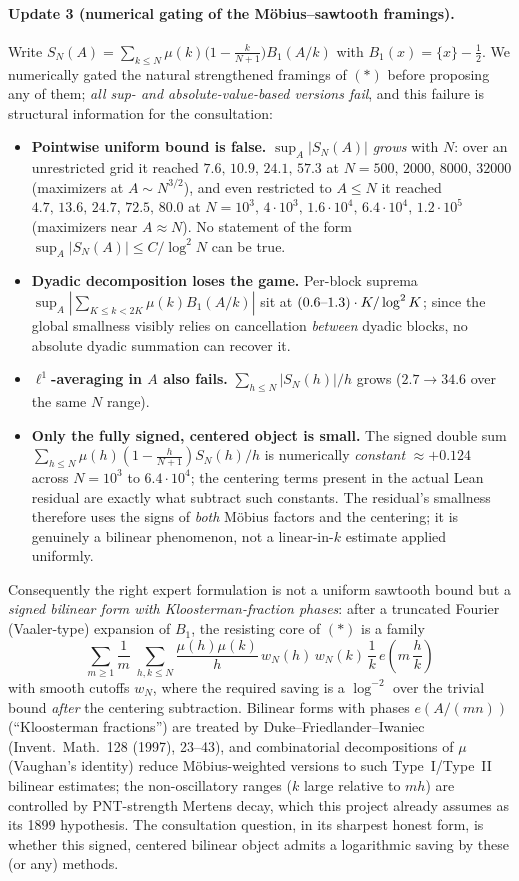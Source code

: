 \documentclass[11pt]{article}
\begin{document}
\paragraph{Update 3 (numerical gating of the M\"obius--sawtooth framings).}
Write $S_N(A)=\sum_{k\le N}\mu(k)\bigl(1-\tfrac{k}{N+1}\bigr)B_1(A/k)$ with
$B_1(x)=\{x\}-\tfrac12$. We numerically gated the natural strengthened
framings of $(\ast)$ before proposing any of them; \emph{all sup- and
absolute-value-based versions fail}, and this failure is structural
information for the consultation:
\begin{itemize}
\item \textbf{Pointwise uniform bound is false.} $\sup_A|S_N(A)|$
\emph{grows} with $N$: over an unrestricted grid it reached
$7.6,\,10.9,\,24.1,\,57.3$ at $N=500,\,2000,\,8000,\,32000$ (maximizers at
$A\sim N^{3/2}$), and even restricted to $A\le N$ it reached
$4.7,\,13.6,\,24.7,\,72.5,\,80.0$ at
$N=10^3,\,4\cdot10^3,\,1.6\cdot10^4,\,6.4\cdot10^4,\,1.2\cdot10^5$
(maximizers near $A\approx N$). No statement of the form
$\sup_A|S_N(A)|\le C/\log^2N$ can be true.
\item \textbf{Dyadic decomposition loses the game.} Per-block suprema
$\sup_A|\sum_{K\le k<2K}\mu(k)B_1(A/k)|$ sit at $(0.6\hbox{--}1.3)\cdot
K/\log^2K$; since the global smallness visibly relies on cancellation
\emph{between} dyadic blocks, no absolute dyadic summation can recover it.
\item \textbf{$\ell^1$-averaging in $A$ also fails.}
$\sum_{h\le N}|S_N(h)|/h$ grows ($2.7\to34.6$ over the same $N$ range).
\item \textbf{Only the fully signed, centered object is small.} The signed
double sum $\sum_{h\le N}\mu(h)(1-\tfrac{h}{N+1})S_N(h)/h$ is numerically
\emph{constant} $\approx+0.124$ across $N=10^3$ to $6.4\cdot10^4$; the
centering terms present in the actual Lean residual are exactly what
subtract such constants. The residual's smallness therefore uses the signs
of \emph{both} M\"obius factors and the centering; it is genuinely a
bilinear phenomenon, not a linear-in-$k$ estimate applied uniformly.
\end{itemize}
Consequently the right expert formulation is not a uniform sawtooth bound
but a \emph{signed bilinear form with Kloosterman-fraction phases}: after a
truncated Fourier (Vaaler-type) expansion of $B_1$, the resisting core of
$(\ast)$ is a family
\[
  \sum_{m\ge1}\frac{1}{m}\;
  \sum_{h,k\le N}\frac{\mu(h)\mu(k)}{h}\,
  w_N(h)\,w_N(k)\,\frac{1}{k}\,e\!\left(m\,\frac{h}{k}\right)
\]
with smooth cutoffs $w_N$, where the required saving is a $\log^{-2}$ over
the trivial bound \emph{after} the centering subtraction. Bilinear forms
with phases $e(A/(mn))$ (``Kloosterman fractions'') are treated by
Duke--Friedlander--Iwaniec (Invent.\ Math.\ 128 (1997), 23--43), and
combinatorial decompositions of $\mu$ (Vaughan's identity) reduce
M\"obius-weighted versions to such Type~I/Type~II bilinear estimates; the
non-oscillatory ranges ($k$ large relative to $mh$) are controlled by
PNT-strength Mertens decay, which this project already assumes as its 1899
hypothesis. The consultation question, in its sharpest honest form, is
whether this signed, centered bilinear object admits a logarithmic saving
by these (or any) methods.
\end{document}
